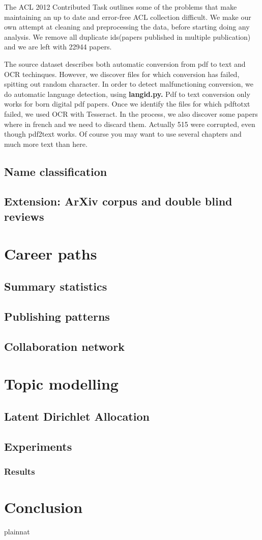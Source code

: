 \documentclass[bsc,frontabs,twoside,singlespacing,parskip,deptreport]{infthesis}     %
\begin{document}
The  ACL 2012 Contributed Task \cite{contributed} outlines some of the problems that make maintaining an up to date and error-free ACL collection difficult. We make our own attempt at cleaning and preprocessing the data, before starting doing any analysis.
We remove all duplicate ids(papers published in multiple publication) and we are left with 22944 papers. 

The source dataset describes both automatic conversion from pdf to text and OCR techinques. However, we discover files for which conversion has failed, spitting out random character.
In order to detect malfunctioning conversion, we do automatic language detection, using \textbf{langid.py.} \cite{langid}
Pdf to text conversion only works for born digital pdf papers. Once we identify the files for which pdftotxt failed, we used OCR with Tesseract. In the process, we also discover some papers where in french and we need to discard them. Actually 515 were corrupted, even though pdf2text works.
Of course
you may want to use several chapters and much more text than here.

\section{Name classification}
\section{Extension: ArXiv corpus and double blind reviews}

\chapter{Career paths}
\section{Summary statistics}
\section{Publishing patterns}
\section{Collaboration network}

\chapter{Topic modelling}
\section{Latent Dirichlet Allocation}
\section{Experiments}
\subsection{Results}

\chapter{Conclusion}

 {plainnat}

\end{document}

